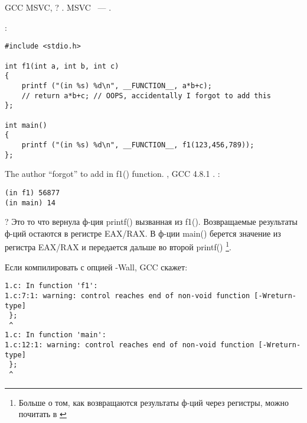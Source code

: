 ﻿\section{}

  \InENRU GCC 
\OrENRU {} \InENRU MSVC, ?
.
  \OrENRU {} 
\InENRU MSVC ~--- 
.

:

\begin{lstlisting}
#include <stdio.h>

int f1(int a, int b, int c)
{
	printf ("(in %s) %d\n", __FUNCTION__, a*b+c);
	// return a*b+c; // OOPS, accidentally I forgot to add this
};

int main()
{
	printf ("(in %s) %d\n", __FUNCTION__, f1(123,456,789));
};
\end{lstlisting}

{The author ``forgot'' to add  in f1() function}.
, GCC 4.8.1 .
:

\begin{lstlisting}
(in f1) 56877
(in main) 14
\end{lstlisting}

?
Это то что вернула ф-ция printf() вызванная из f1().
Возвращаемые результаты ф-ций 
остаются в регистре EAX/RAX.
В ф-ции main() берется значение из регистра EAX/RAX и передается дальше во второй printf()
\footnote{Больше о том, как возвращаются результаты ф-ций через регистры, можно почитать в \cite{REBook}}.

Если компилировать с опцией -Wall, GCC скажет:

\begin{lstlisting}
1.c: In function 'f1':
1.c:7:1: warning: control reaches end of non-void function [-Wreturn-type]
 };
 ^
1.c: In function 'main':
1.c:12:1: warning: control reaches end of non-void function [-Wreturn-type]
 };
 ^
\end{lstlisting}

